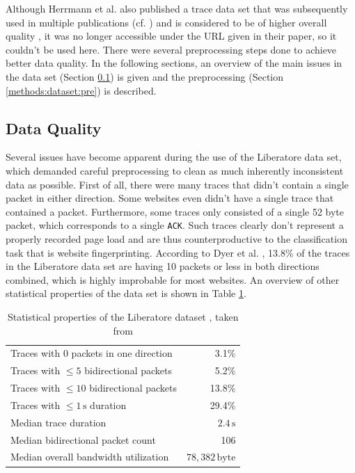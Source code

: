 \documentclass[
	ruledheaders=chapter,
	class=report,
	thesis={type=master, department=inf},
	accentcolor=1c,
	custommargins=true,
	marginpar=false,
	parskip=half-,
	fontsize=11pt,
]{tudapub}
\begin{document}
	Although Herrmann et al. \cite{Herrmann2009} also published a trace data set that was subsequently used in multiple publications (cf. \cite{Panchenko2011,Dyer2012}) and is considered to be of higher overall quality \cite{Dyer2012}, it was no longer accessible under the URL given in their paper, so it couldn't be used here. There were several preprocessing steps done to achieve better data quality. In the following sections, an overview of the main issues in the data set (Section \ref{methods:dataset:quality}) is given and the preprocessing (Section \ref{methods:dataset:pre}) is described.
	
	\subsection{Data Quality}
	\label{methods:dataset:quality}
	
	Several issues have become apparent during the use of the Liberatore data set, which demanded careful preprocessing to clean as much inherently inconsistent data as possible. First of all, there were many traces that didn't contain a single packet in either direction. Some websites even didn't have a single trace that contained a packet. Furthermore, some traces only consisted of a single 52 byte packet, which corresponds to a single \texttt{ACK}. Such traces clearly don't represent a properly recorded page load and are thus counterproductive to the classification task that is website fingerprinting. According to Dyer et al. \cite{Dyer2012}, 13.8\% of the traces in the Liberatore data set are having 10 packets or less in both directions combined, which is highly improbable for most websites. An overview of other statistical properties of the data set is shown in Table \ref{tbl:dataset_props}.
	
	\begin{table}
		\centering
		\begin{tabularx}{0.7\textwidth}{Xr}
			\toprule Traces with 0 packets in one direction & 3.1\% \\
			Traces with $\leq 5$ bidirectional packets & 5.2\% \\
			Traces with $\leq 10$ bidirectional packets & 13.8\% \\
			Traces with $\leq 1\,\text{s}$ duration & 29.4\% \\
			Median trace duration & $2.4\,\text{s}$ \\
			Median bidirectional packet count & 106 \\
			Median overall bandwidth utilization & $78,382\,\text{byte}$ \\
			\bottomrule
		\end{tabularx}
		\caption{Statistical properties of the Liberatore dataset \cite{Liberatore2006}, taken from \cite{Dyer2012}}
		\label{tbl:dataset_props}
	\end{table} 
	
\end{document}
